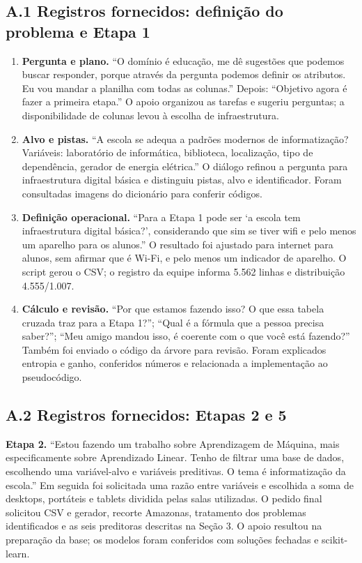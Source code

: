 \documentclass[10pt,a4paper]{article}
\begin{document}
\subsection*{A.1 Registros fornecidos: definição do problema e Etapa 1}
\begin{enumerate}[label=\arabic*.]
\item \textbf{Pergunta e plano.} ``O domínio é educação, me dê sugestões que podemos buscar responder, porque através da pergunta podemos definir os atributos. Eu vou mandar a planilha com todas as colunas.'' Depois: ``Objetivo agora é fazer a primeira etapa.'' O apoio organizou as tarefas e sugeriu perguntas; a disponibilidade de colunas levou à escolha de infraestrutura.
\item \textbf{Alvo e pistas.} ``A escola se adequa a padrões modernos de informatização? Variáveis: laboratório de informática, biblioteca, localização, tipo de dependência, gerador de energia elétrica.'' O diálogo refinou a pergunta para infraestrutura digital básica e distinguiu pistas, alvo e identificador. Foram consultadas imagens do dicionário para conferir códigos.
\item \textbf{Definição operacional.} ``Para a Etapa 1 pode ser `a escola tem infraestrutura digital básica?', considerando que sim se tiver wifi e pelo menos um aparelho para os alunos.'' O resultado foi ajustado para internet para alunos, sem afirmar que é Wi-Fi, e pelo menos um indicador de aparelho. O script gerou o CSV; o registro da equipe informa 5.562 linhas e distribuição 4.555/1.007.
\item \textbf{Cálculo e revisão.} ``Por que estamos fazendo isso? O que essa tabela cruzada traz para a Etapa 1?''; ``Qual é a fórmula que a pessoa precisa saber?''; ``Meu amigo mandou isso, é coerente com o que você está fazendo?'' Também foi enviado o código da árvore para revisão. Foram explicados entropia e ganho, conferidos números e relacionada a implementação ao pseudocódigo.
\end{enumerate}

\subsection*{A.2 Registros fornecidos: Etapas 2 e 5}
\textbf{Etapa 2.} ``Estou fazendo um trabalho sobre Aprendizagem de Máquina, mais especificamente sobre Aprendizado Linear. Tenho de filtrar uma base de dados, escolhendo uma variável-alvo e variáveis preditivas. O tema é informatização da escola.'' Em seguida foi solicitada uma razão entre variáveis e escolhida a soma de desktops, portáteis e tablets dividida pelas salas utilizadas. O pedido final solicitou CSV e gerador, recorte Amazonas, tratamento dos problemas identificados e as seis preditoras descritas na Seção 3. O apoio resultou na preparação da base; os modelos foram conferidos com soluções fechadas e scikit-learn.
\end{document}
